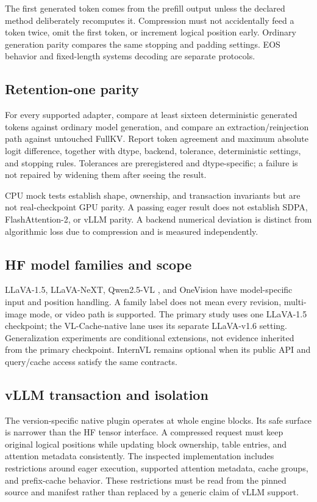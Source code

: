 The first generated token comes from the prefill output unless the declared
method deliberately recomputes it. Compression must not accidentally feed a
token twice, omit the first token, or increment logical position early.
Ordinary generation parity compares the same stopping and padding settings.
EOS behavior and fixed-length systems decoding are separate protocols.

\subsection{Retention-one parity}
For every supported adapter, compare at least sixteen deterministic generated
tokens against ordinary model generation, and compare an extraction/reinjection
path against untouched FullKV. Report token agreement and maximum absolute
logit difference, together with dtype, backend, tolerance, deterministic settings,
and stopping rules. Tolerances are preregistered and dtype-specific; a failure
is not repaired by widening them after seeing the result.

CPU mock tests establish shape, ownership, and transaction invariants but are
not real-checkpoint GPU parity. A passing eager result does not establish SDPA,
FlashAttention-2, or vLLM parity. A backend numerical deviation is distinct from
algorithmic loss due to compression and is measured independently.

\subsection{HF model families and scope}
LLaVA-1.5, LLaVA-NeXT, Qwen2.5-VL \citep{bai2025qwen}, and OneVision have model-specific input and
position handling. A family label does not mean every revision, multi-image
mode, or video path is supported. The primary study uses one LLaVA-1.5
checkpoint; the VL-Cache-native lane uses its separate LLaVA-v1.6 setting.
Generalization experiments are conditional extensions, not evidence inherited
from the primary checkpoint. InternVL remains optional when its public API and
query/cache access satisfy the same contracts.

\subsection{vLLM transaction and isolation}
The version-specific native plugin operates at whole engine blocks. Its safe
surface is narrower than the HF tensor interface. A compressed request must
keep original logical positions while updating block ownership, table entries,
and attention metadata consistently. The inspected implementation includes
restrictions around eager execution, supported attention metadata, cache groups,
and prefix-cache behavior. These restrictions must be read from the pinned
source and manifest rather than replaced by a generic claim of vLLM support.

